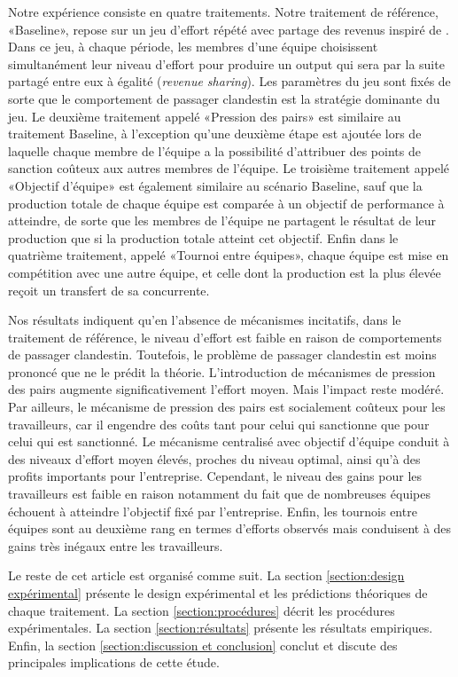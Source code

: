 \begin{Article}
\begin{refsection}[Lebourges]
Notre expérience consiste en quatre traitements. Notre traitement de
référence, «Baseline», repose sur un jeu d'effort répété avec partage
des revenus inspiré de \textcite{NalbantianSchotter1997}. Dans ce jeu, à
chaque période, les membres d'une équipe choisissent simultanément leur
niveau d'effort pour produire un output qui sera par la suite partagé
entre eux à égalité (\emph{revenue sharing}). Les paramètres du jeu sont
fixés de sorte que le comportement de passager clandestin est la
stratégie dominante du jeu. Le deuxième traitement appelé «Pression des
pairs» est similaire au traitement Baseline, à l'exception qu'une
deuxième étape est ajoutée lors de laquelle chaque membre de l'équipe a
la possibilité d'attribuer des points de sanction coûteux aux autres
membres de l'équipe. Le troisième traitement appelé «Objectif
d'équipe» est également similaire au scénario Baseline, sauf que la
production totale de chaque équipe est comparée à un objectif de
performance à atteindre, de sorte que les membres de l'équipe ne
partagent le résultat de leur production que si la production totale
atteint cet objectif. Enfin dans le quatrième traitement, appelé
«Tournoi entre équipes», chaque équipe est mise en compétition avec
une autre équipe, et celle dont la production est la plus élevée reçoit
un transfert de sa concurrente.

Nos résultats indiquent qu'en l'absence de mécanismes incitatifs, dans
le traitement de référence, le niveau d'effort est faible en raison de
comportements de passager clandestin. Toutefois, le problème de passager
clandestin est moins prononcé que ne le prédit la théorie.
L'introduction de mécanismes de pression des pairs augmente
significativement l'effort moyen. Mais l'impact reste modéré. Par
ailleurs, le mécanisme de pression des pairs est socialement coûteux
pour les travailleurs, car il engendre des coûts tant pour celui qui
sanctionne que pour celui qui est sanctionné. Le mécanisme centralisé
avec objectif d'équipe conduit à des niveaux d'effort moyen élevés,
proches du niveau optimal, ainsi qu'à des profits importants pour
l'entreprise. Cependant, le niveau des gains pour les travailleurs est
faible en raison notamment du fait que de nombreuses équipes échouent à
atteindre l'objectif fixé par l'entreprise. Enfin, les tournois entre
équipes sont au deuxième rang en termes d'efforts observés mais
conduisent à des gains très inégaux entre les travailleurs.

Le reste de cet article est organisé comme suit. La section \ref{section:design expérimental} présente le design expérimental et les prédictions théoriques de chaque
traitement. La section \ref{section:procédures} décrit les procédures expérimentales.
La section \ref{section:résultats} présente les résultats empiriques. Enfin, la section \ref{section:discussion et conclusion} conclut et discute des principales implications de cette étude.


\end{refsection}
\end{Article}

